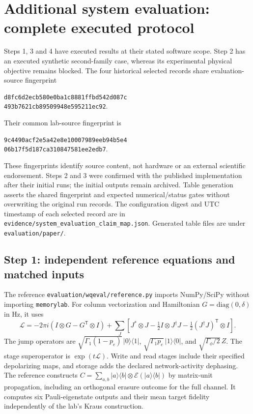 \documentclass[10pt,a4paper]{article}
\newcommand{\code}[1]{\texttt{#1}}
\begin{document}
\section{Additional system evaluation: complete executed protocol}
\label{sec:systemprotocol}
Steps 1, 3 and 4 have executed results at their stated software scope. Step 2 has an executed synthetic second-family case, whereas its experimental physical objective remains blocked. The four historical selected records share evaluation-source fingerprint
\par\noindent\begin{minipage}{\linewidth}\centering\small\texttt{d8fc6d2ecb580e0ba1c8881ffbd542d087c}\\\texttt{493b7621cb89509948e595211ec92}.\end{minipage}\par
Their common lab-source fingerprint is
\par\noindent\begin{minipage}{\linewidth}\centering\small\texttt{9c4490acf2e5a42e8e10007989eeb94b5e4}\\\texttt{06b17f5d187ca310847581ee2edb7}.\end{minipage}\par
These fingerprints identify source content, not hardware or an external scientific endorsement. Steps 2 and 3 were confirmed with the published implementation after their initial runs; the initial outputs remain archived. Table generation asserts the shared fingerprint and expected numerical/status gates without overwriting the original run records. The configuration digest and UTC timestamp of each selected record are in \code{evidence/system\_evaluation\_claim\_map.json}. Generated table files are under \code{evaluation/paper/}.

\subsection{Step 1: independent reference equations and matched inputs}
The reference \code{evaluation/wqeval/reference.py} imports NumPy/SciPy without importing \code{memorylab}. For column vectorization and Hamiltonian $G=\mathrm{diag}(0,\delta)$ in Hz, it uses
\[
\mathcal L=-2\pi i(I\otimes G-G^{\mathsf T}\otimes I)
+\sum_J\left[J^*\otimes J-\tfrac12 I\otimes J^\dagger J
-\tfrac12(J^\dagger J)^{\mathsf T}\otimes I\right].
\]
The jump operators are $\sqrt{\Gamma_1(1-p_e)}\,|0\rangle\langle1|$, $\sqrt{\Gamma_1p_e}\,|1\rangle\langle0|$, and $\sqrt{\Gamma_\phi/2}\,Z$. The stage superoperator is $\exp(t\mathcal L)$. Write and read stages include their specified depolarizing maps, and storage adds the declared network-activity dephasing. The reference constructs $C=\sum_{a,b}|a\rangle\langle b|\otimes\mathcal E(|a\rangle\langle b|)$ by matrix-unit propagation, including an orthogonal erasure outcome for the full channel. It computes six Pauli-eigenstate outputs and their mean target fidelity independently of the lab's Kraus construction.
\end{document}
